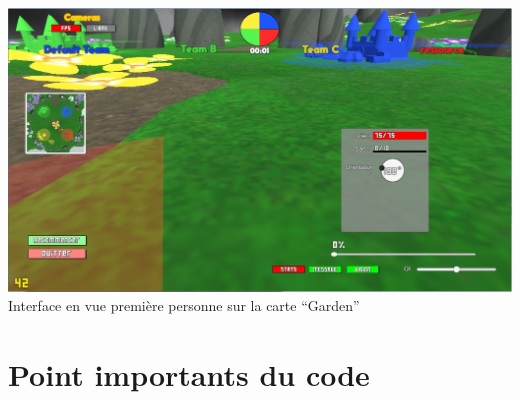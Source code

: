 \documentclass{report}
\begin{document}
\paragraph{}

\paragraph{}
\begin{adjustwidth}{-3em}{}
\includegraphics[scale=0.5]{DATA/enjeufps.png}
 {Interface en vue première personne sur la carte “Garden”}
\end{adjustwidth}
\paragraph{}


\section{Point importants du code}
\end{document}
